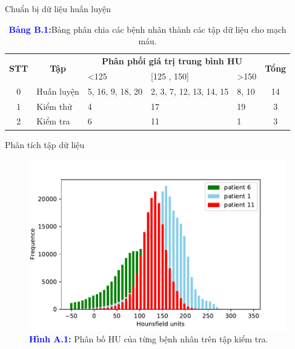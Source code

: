 \documentclass[
	10pt,                %
	aspectratio=169,     %
]{beamer}
\begin{document}
	\begin{frame}[noframenumbering]{Chuẩn bị dữ liệu huấn luyện}
	    \begin{table}[H]
            \centering
            \begin{tabular}{|c|l|l|l|l|c|}
            \hline
            \multicolumn{1}{|c|}{\multirow{2}{*}{\textbf{STT}}} & \multicolumn{1}{c|}{\multirow{2}{*}{\textbf{Tập}}} & \multicolumn{3}{c|}{\textbf{Phân phối giá trị trung bình HU}}       & \multirow{2}{*}{\textbf{Tổng}} \\ \cline{3-5}
            \multicolumn{1}{|c|}{}                     & \multicolumn{1}{c|}{}                     & \textless{}125 & {[}125 , 150{]}        & \textgreater 150 &                       \\ \hline
            0 & Huấn luyện   & 5, 16, 9, 18, 20  & 2, 3, 7, 12, 13, 14, 15 & 8, 10    & 14                    \\ \hline
            1 & Kiểm thử     & 4             & 17                     & 19          & 3                     \\ \hline
            2 & Kiểm tra     & 6             & 11                     & 1           & 3                     \\ \hline
            \end{tabular}
            \caption*{\textcolor{blue}{\textbf{Bảng B.1:}}Bảng phân chia các bệnh nhân thành các tập dữ liệu cho mạch máu.}
        \end{table}
	\end{frame}
	
	\begin{frame}[noframenumbering]{Phân tích tập dữ liệu}
	    \vspace{-0.3cm}
	    \begin{figure}[H]
    	    \centering
        	\includegraphics[scale=0.7]{Presentation_template/figures/dataset/test_hist.pdf}
        	\caption*{\textcolor{blue}{\textbf{Hình A.1:}} Phân bố HU của từng bệnh nhân trên tập kiểm tra.}
        \end{figure}
	\end{frame}
	
\end{document}

